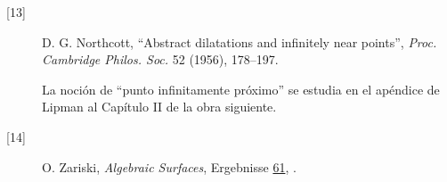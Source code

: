 \begin{description}
\item[{[13]}] D. G. Northcott, ``Abstract dilatations and infinitely near
points'', \textit{Proc. Cambridge Philos. Soc.} 52 (1956), 178--197.

\item[] La noción de ``punto infinitamente próximo'' se estudia en el apéndice
de Lipman al Capítulo II de la obra siguiente.

\item[{[14]}] O. Zariski, \textit{Algebraic Surfaces}, Ergebnisse
\underline{61}, .
\end{description}

